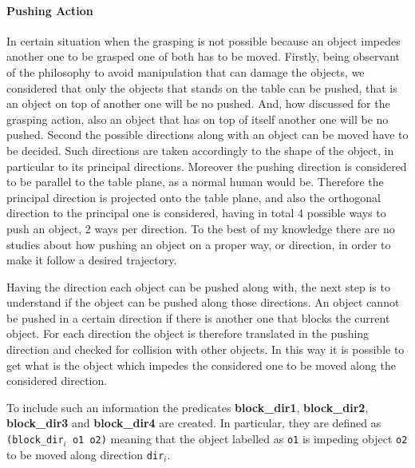 \paragraph{Pushing Action}
In certain situation when the grasping is not possible because an object impedes another one to be grasped one of both has to be moved. Firstly, being observant of the philosophy to avoid manipulation that can damage the objects, we considered that only the objects that stands on the table can be pushed, that is an object on top of another one will be no pushed. And, how discussed for the grasping action, also an object that has on top of itself another one will be no pushed.
Second the possible directions along with an object can be moved have to be decided. Such directions are taken accordingly to the shape of the object, in particular to its principal directions. Moreover the pushing direction is considered to be parallel to the table plane, as a normal human would be. Therefore the principal direction is projected onto the table plane, and also the orthogonal direction to the principal one is considered, having in total 4 possible ways to push an object, 2 ways per direction. To the best of my knowledge there are no studies about how pushing an object on a proper way, or direction, in order to make it follow a desired trajectory. 

Having the direction each object can be pushed along with, the next step is to understand if the object can be pushed along those directions. An object cannot be pushed in a certain direction if there is another one that blocks the current object. For each direction the object is therefore translated in the pushing direction and checked for collision with other objects. In this way it is possible to get what is the object which impedes the considered one to be moved along the considered direction. 

To include such an information the predicates \textbf{block\_dir1}, \textbf{block\_dir2}, \textbf{block\_dir3} and \textbf{block\_dir4} are created. In particular, they are defined as \texttt{(block\_dir}$_i$\texttt{ o1 o2)} meaning that the object labelled as \texttt{o1} is impeding object \texttt{o2} to be moved along direction \texttt{dir}$_i$.

